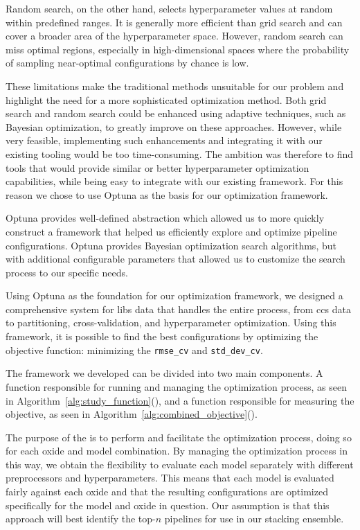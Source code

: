 Random search, on the other hand, selects hyperparameter values at random within predefined ranges. 
It is generally more efficient than grid search and can cover a broader area of the hyperparameter space. 
However, random search can miss optimal regions, especially in high-dimensional spaces where the probability of sampling near-optimal configurations by chance is low. 

These limitations make the traditional methods unsuitable for our problem and highlight the need for a more sophisticated optimization method.
Both grid search and random search could be enhanced using adaptive techniques, such as Bayesian optimization, to greatly improve on these approaches.
However, while very feasible, implementing such enhancements and integrating it with our existing tooling would be too time-consuming.
The ambition was therefore to find tools that would provide similar or better hyperparameter optimization capabilities, while being easy to integrate with our existing framework.
For this reason we chose to use Optuna as the basis for our optimization framework.

Optuna provides well-defined abstraction which allowed us to more quickly construct a framework that helped us efficiently explore and optimize pipeline configurations\cite{optuna_2019}.
Optuna provides Bayesian optimization search algorithms, but with additional configurable parameters that allowed us to customize the search process to our specific needs.

Using Optuna as the foundation for our optimization framework, we designed a comprehensive system for \gls{libs} data that handles the entire process, from \gls{ccs} data to partitioning, cross-validation, and hyperparameter optimization.
Using this framework, it is possible to find the best configurations by optimizing the objective function: minimizing the \texttt{rmse\_cv} and \texttt{std\_dev\_cv}.

The framework we developed can be divided into two main components.
A function responsible for running and managing the optimization process, as seen in Algorithm~\ref{alg:study_function}(), and a function responsible for measuring the objective, as seen in Algorithm~\ref{alg:combined_objective}().

The purpose of the  is to perform and facilitate the optimization process, doing so for each oxide and model combination.
By managing the optimization process in this way, we obtain the flexibility to evaluate each model separately with different preprocessors and hyperparameters.
This means that each model is evaluated fairly against each oxide and that the resulting configurations are optimized specifically for the model and oxide in question.
Our assumption is that this approach will best identify the top-$n$ pipelines for use in our stacking ensemble.


